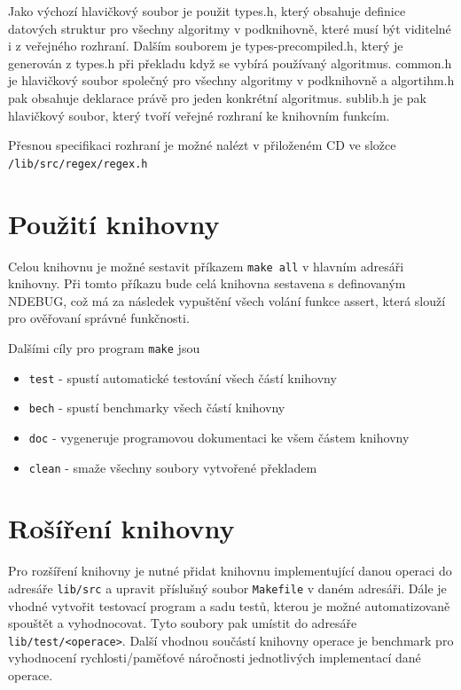 Jako výchozí hlavičkový soubor je použit types.h, který obsahuje definice datových struktur pro všechny algoritmy v podknihovně, které musí být viditelné i z veřejného rozhraní. Dalším souborem je types-precompiled.h, který je generován z types.h při překladu když se vybírá používaný algoritmus. common.h je hlavičkový soubor společný pro všechny algoritmy v podknihovně a algortihm.h pak obsahuje deklarace právě pro jeden konkrétní algoritmus.
sublib.h je pak hlavičkový soubor, který tvoří veřejné rozhraní ke knihovním funkcím.

Přesnou specifikaci rozhraní je možné nalézt v přiloženém CD ve složce \texttt{/lib/src/regex/regex.h}

\section{Použití knihovny}
Celou knihovnu je možné sestavit příkazem \texttt{make all} v hlavním adresáři knihovny.
Při tomto příkazu bude celá knihovna sestavena s definovaným NDEBUG, což má za následek vypuštění všech
volání funkce assert, která slouží pro ověřovaní správné funkčnosti.

Dalšími cíly pro program \texttt{make} jsou

\begin{itemize}
	\item{\texttt{test} - spustí automatické testování všech částí knihovny}
	\item{\texttt{bech} - spustí benchmarky všech částí knihovny}
	\item{\texttt{doc} - vygeneruje programovou dokumentaci ke všem částem knihovny}
	\item{\texttt{clean} - smaže všechny soubory vytvořené překladem}
\end{itemize}

\section{Rošíření knihovny}

Pro rozšíření knihovny je nutné přidat knihovnu implementující danou operaci
do adresáře \texttt{lib/src} a upravit příslušný soubor \texttt{Makefile} v daném adresáři.
Dále je vhodné vytvořit testovací program a sadu testů, kterou je možné automatizovaně spouštět a vyhodnocovat.
Tyto soubory pak umístit do adresáře \texttt{lib/test/<operace>}.
Další vhodnou součástí knihovny operace je benchmark pro vyhodnocení rychlosti/paměťové náročnosti jednotlivých
implementací dané operace.

